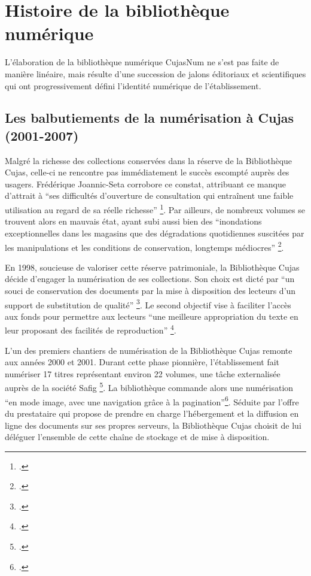 \section[Bibliothèque numérique]{Histoire de la bibliothèque numérique}
L'élaboration de la bibliothèque numérique CujasNum ne s'est pas faite de manière linéaire, mais résulte d'une succession de jalons éditoriaux et scientifiques qui ont progressivement défini l'identité numérique de l'établissement.

\subsection{Les balbutiements de la numérisation à Cujas (2001-2007)}
Malgré la richesse des collections conservées dans la réserve de la Bibliothèque Cujas, celle-ci ne rencontre pas immédiatement le succès escompté auprès des usagers. Frédérique Joannic-Seta corrobore ce constat, attribuant ce manque d'attrait à \enquote{ses difficultés d'ouverture de consultation qui entraînent une faible utilisation au regard de sa réelle richesse} \footcite{joannic-setaEtudePrealableOperation1999}. Par ailleurs, de nombreux volumes se trouvent alors en mauvais état, ayant subi aussi bien des \enquote{inondations exceptionnelles dans les magasins que des dégradations quotidiennes suscitées par les manipulations et les conditions de conservation, longtemps médiocres} \footcite{joannic-setaEtudePrealableOperation1999}. 

En 1998, soucieuse de valoriser cette réserve patrimoniale, la Bibliothèque Cujas décide d'engager la numérisation de ses collections. Son choix est dicté par \enquote{un souci de conservation des documents par la mise à disposition des lecteurs d'un support de substitution de qualité} \footcite{joannic-setaEtudePrealableOperation1999}. Le second objectif vise à faciliter l'accès aux fonds pour permettre aux lecteurs \enquote{une meilleure appropriation du texte en leur proposant des facilités de reproduction} \footcite{joannic-setaEtudePrealableOperation1999}. 

L'un des premiers chantiers de numérisation de la Bibliothèque Cujas remonte aux années 2000 et 2001. Durant cette phase pionnière, l'établissement fait numériser 17 titres représentant environ 22 volumes, une tâche externalisée auprès de la société Safig \footcite{2006ProgrammeNumerisation}. La bibliothèque commande alors une numérisation \enquote{en mode image, avec une navigation grâce à la pagination}\footnote{.}. Séduite par l'offre du prestataire qui propose de prendre en charge l'hébergement et la diffusion en ligne des documents sur ses propres serveurs, la Bibliothèque Cujas choisit de lui déléguer l'ensemble de cette chaîne de stockage et de mise à disposition. 

